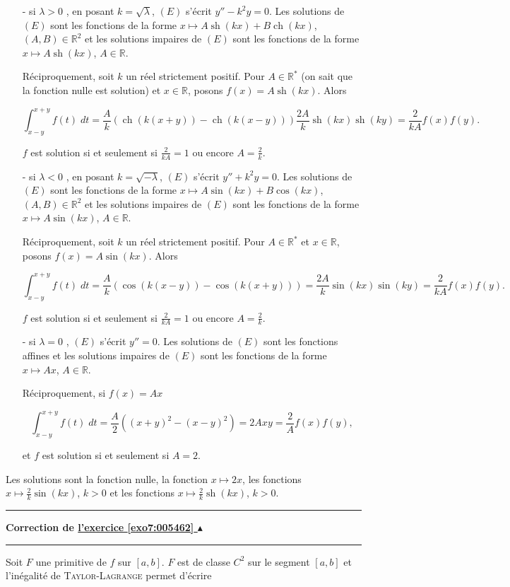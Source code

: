 \documentclass[11pt,a4paper]{article}
\newcommand{\Rr}{\mathbb{R}} \newcommand{\R}{\mathbb{R}}
\newcommand{\ch}{\mathop{\mathrm{ch}}\nolimits}
\newcommand{\sh}{\mathop{\mathrm{sh}}\nolimits}
\newcounter{exo}
\newcommand{\correction}[1]{\hypertarget{cor7:#1}{}\label{cor7:#1}{\bf Correction de \hyperlink{exo7:#1}{l'exercice \ref{exo7:#1} $\blacktriangle$}}\vspace{1mm}\hrule\vspace{1mm}}
\newcommand{\fincorrection}{\vspace{1mm}\hrule\vspace*{7mm}}
\begin{document}
\begin{itemize}
\item[- si $\lambda>0$], en posant $k=\sqrt{\lambda}$, $(E)$ s'écrit $y''-k^2y=0$. Les solutions de $(E)$ sont les fonctions de la forme $x\mapsto A\sh(kx)+B\ch(kx)$, $(A,B)\in\Rr^2$ et les solutions impaires de $(E)$ sont les fonctions de la forme $x\mapsto A\sh(kx)$, $A\in\Rr$.

Réciproquement, soit $k$ un réel strictement positif. Pour $A\in\Rr^*$ (on sait que la fonction nulle est solution) et $x\in\Rr$, posons $f(x)=A\sh(kx)$. Alors

$$\int_{x-y}^{x+y}f(t)\;dt=\frac{A}{k}(\ch(k(x+y))-\ch(k(x-y)))\frac{2A}{k}\sh(kx)\sh(ky)=\frac{2}{kA}f(x)f(y).$$

$f$ est solution si et seulement si $\frac{2}{kA}=1$ ou encore $A=\frac{2}{k}$.

\item[- si $\lambda<0$], en posant $k=\sqrt{-\lambda}$, $(E)$ s'écrit $y''+k^2y=0$. Les solutions de $(E)$ sont les fonctions de la forme $x\mapsto A\sin(kx)+B\cos(kx)$, $(A,B)\in\Rr^2$ et les solutions impaires de $(E)$ sont les fonctions de la forme $x\mapsto A\sin(kx)$, $A\in\Rr$.

Réciproquement, soit $k$ un réel strictement positif. Pour $A\in\Rr^*$ et $x\in\Rr$, posons $f(x)=A\sin(kx)$. Alors

$$\int_{x-y}^{x+y}f(t)\;dt=\frac{A}{k}(\cos(k(x-y))-\cos(k(x+y)))=\frac{2A}{k}\sin(kx)\sin(ky)=\frac{2}{kA}f(x)f(y).$$

$f$ est solution si et seulement si $\frac{2}{kA}=1$ ou encore $A=\frac{2}{k}$.

\item[- si $\lambda=0$], $(E)$ s'écrit $y''=0$. Les solutions de $(E)$ sont les fonctions affines et les solutions impaires de $(E)$ sont les fonctions de la forme $x\mapsto Ax$, $A\in\Rr$.

Réciproquement, si $f(x)=Ax$

$$\int_{x-y}^{x+y}f(t)\;dt=\frac{A}{2}((x+y)^2-(x-y)^2)=2Axy=\frac{2}{A}f(x)f(y),$$

et $f$ est solution si et seulement si $A=2$.

\end{itemize}

Les solutions sont la fonction nulle, la fonction $x\mapsto2x$, les fonctions $x\mapsto\frac{2}{k}\sin(kx)$, $k>0$ et les fonctions $x\mapsto\frac{2}{k}\sh(kx)$, $k>0$.
\fincorrection
\correction{005462}
Soit $F$ une primitive de $f$ sur $[a,b]$. $F$ est de classe $C^2$ sur le segment $[a,b]$ et l'inégalité de \textsc{Taylor}-\textsc{Lagrange} permet d'écrire
\end{document}
